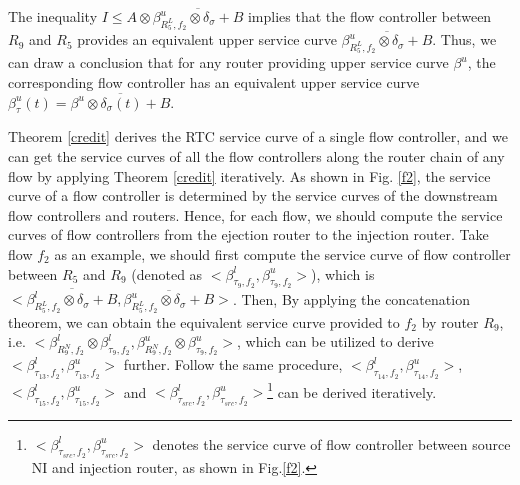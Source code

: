 \documentclass[10pt,journal]{IEEEtran}
\begin{document}
\begin{IEEEproof}
The inequality $I\leq A\otimes \overline{\beta_{R_5^L,f_2}^u\otimes\delta_\sigma+B}$ implies that the flow controller between $R_9$ and $R_5$ provides an equivalent upper service curve $\overline{\beta_{R_5^L,f_2}^u\otimes\delta_\sigma+B}$. Thus, we can draw a conclusion that for any router providing upper service curve $\beta^u$, the corresponding flow controller has an equivalent upper service curve $\beta^{u}_\tau(t)=\overline{\beta^u\otimes\delta_\sigma(t)+B}$.
\end{IEEEproof}

Theorem \ref{credit} derives the RTC service curve of a single flow controller, and we can get the service curves of all the flow controllers along the router chain of any flow by applying Theorem \ref{credit} iteratively. As shown in Fig. \ref{f2}, the service curve of a flow controller is determined by the service curves of the downstream flow controllers and routers. Hence, for each flow, we should compute the service curves of flow controllers from the ejection router to the injection router. Take flow $f_2$ as an example, we should first compute the service curve of flow controller between $R_5$ and $R_{9}$ (denoted as $<\beta_{\tau_9,f_2}^l,\beta_{\tau_9,f_2}^u>$), which is $<\overline{\beta_{R_5^L,f_2}^l\otimes\delta_\sigma+B},\overline{\beta_{R_5^L,f_2}^u\otimes\delta_\sigma+B}>$. Then, By applying the concatenation theorem, we can obtain the equivalent service curve provided to $f_2$ by router $R_{9}$, i.e. $<\beta_{R_9^N,f_2}^l\otimes\beta_{\tau_9,f_2}^l,\beta_{R_9^N,f_2}^u\otimes\beta_{\tau_9,f_2}^u>$, which can be utilized to derive $<\beta_{\tau_{13},f_2}^l,\beta_{\tau_{13},f_2}^u>$ further. Follow the same procedure, $<\beta_{\tau_{14},f_2}^l,\beta_{\tau_{14},f_2}^u>$, $<\beta_{\tau_{15},f_2}^l,\beta_{\tau_{15},f_2}^u>$ and $<\beta_{\tau_{src},f_2}^l,\beta_{\tau_{src},f_2}^u>$\footnote{$<\beta_{\tau_{src},f_2}^l,\beta_{\tau_{src},f_2}^u>$ denotes the service curve of flow controller between source NI and injection router, as shown in Fig.\ref{f2}.} can be derived iteratively.
\end{document}
